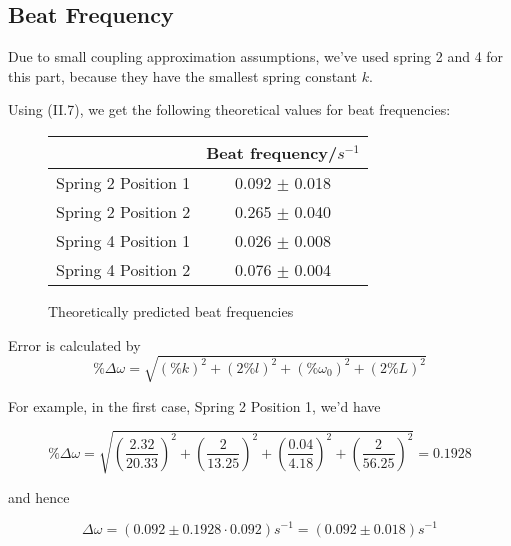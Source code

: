 \documentclass[main.tex]{subfiles}
\begin{document}
\subsection{Beat Frequency}
Due to small coupling approximation assumptions, we've used spring 2 and 4 for this part, because they have the smallest spring constant $k$. 

Using (II.7), we get the following theoretical values for beat frequencies:
\begin{figure}[H]
\begin{tabular}{|c|c|}
\hline
& Beat frequency/$s^{-1}$ \\
\hline
Spring 2 Position 1 & 0.092 $\pm$ 0.018 \\
Spring 2 Position 2 & 0.265 $\pm$ 0.040 \\
Spring 4 Position 1 & 0.026 $\pm$ 0.008 \\
Spring 4 Position 2 & 0.076 $\pm$ 0.004 \\
\hline
\end{tabular}
\caption{Theoretically predicted beat frequencies}
\end{figure}

Error is calculated by $$ \%\Delta\omega = \sqrt{(\% k)^2 + (2\% l)^2 + (\% \omega_0)^2 + (2 \% L)^2} $$

For example, in the first case, Spring 2 Position 1, we'd have 

$$ \%\Delta\omega = \sqrt{(\frac{2.32}{20.33})^2 + (\frac{2}{13.25})^2 + (\frac{0.04}{4.18})^2 + (\frac{2}{56.25})^2} = 0.1928 $$

and hence

$$ \Delta\omega = (0.092 \pm 0.1928 \cdot 0.092)s^{-1} = (0.092 \pm 0.018)s^{-1} $$
\end{document}
